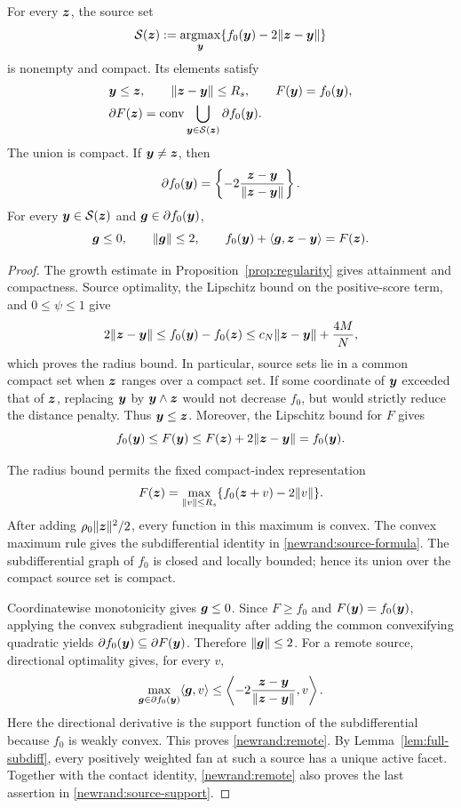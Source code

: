 \begin{lemma}
\label{newrand:sources}
For every $\bm{z}$, the source set
\[
 \mathcal S(\bm{z}):=\operatorname*{argmax}_{\bm{y}}
       \{f_0(\bm{y})-2\|\bm{z}-\bm{y}\|\}
\]
is nonempty and compact. Its elements satisfy
\begin{equation}
 \begin{aligned}
 &\bm{y}\le\bm{z},\qquad \|\bm{z}-\bm{y}\|\le R_s,
       \qquad F(\bm{y})=f_0(\bm{y}),\\
 &\partial F(\bm{z})=\operatorname{conv}
       \bigcup_{\bm{y}\in\mathcal S(\bm{z})}\partial f_0(\bm{y}).
 \end{aligned}
 \label{newrand:source-formula}
\end{equation}
The union is compact. If $\bm{y}\ne\bm{z}$, then
\begin{equation}
 \partial f_0(\bm{y})
 =\left\{-2\frac{\bm{z}-\bm{y}}{\|\bm{z}-\bm{y}\|}\right\}.
 \label{newrand:remote}
\end{equation}
For every $\bm{y}\in\mathcal S(\bm{z})$ and
$\bm{g}\in\partial f_0(\bm{y})$,
\begin{equation}
 \bm{g}\le0,\qquad \|\bm{g}\|\le2,\qquad
 f_0(\bm{y})+\langle\bm{g},\bm{z}-\bm{y}\rangle=F(\bm{z}).
 \label{newrand:source-support}
\end{equation}
\end{lemma}
\begin{proof}
The growth estimate in Proposition~\ref{prop:regularity} gives
attainment and compactness. Source optimality, the Lipschitz
bound on the positive-score term, and $0\le\psi\le1$ give
\[
 2\|\bm{z}-\bm{y}\|\le f_0(\bm{y})-f_0(\bm{z})
 \le c_N\|\bm{z}-\bm{y}\|+\frac{4M}{N},
\]
which proves the radius bound. In particular, source sets lie in
a common compact set when $\bm{z}$ ranges over a compact set.
If some coordinate of $\bm{y}$ exceeded that of $\bm{z}$, replacing
$\bm{y}$ by $\bm{y}\wedge\bm{z}$ would not decrease $f_0$, but would
strictly reduce the distance penalty. Thus $\bm{y}\le\bm{z}$.
Moreover, the Lipschitz bound for $F$ gives
\[
 f_0(\bm{y})\le F(\bm{y})
 \le F(\bm{z})+2\|\bm{z}-\bm{y}\|=f_0(\bm{y}).
\]

The radius bound permits the fixed compact-index representation
\[
 F(\bm{z})=\max_{\|v\|\le R_s}
       \{f_0(\bm{z}+v)-2\|v\|\}.
\]
After adding $\rho_0\|\bm{z}\|^2/2$, every function in this
maximum is convex. The convex maximum rule gives the
subdifferential identity in \eqref{newrand:source-formula}.
The subdifferential graph of $f_0$ is closed and locally bounded;
hence its union over the compact source set is compact.

Coordinatewise monotonicity gives $\bm{g}\le0$.
Since $F\ge f_0$ and $F(\bm{y})=f_0(\bm{y})$, applying the convex
subgradient inequality after adding the common convexifying
quadratic yields
$\partial f_0(\bm{y})\subseteq\partial F(\bm{y})$.
Therefore $\|\bm{g}\|\le2$.
For a remote source, directional optimality gives, for every $v$,
\[
 \max_{\bm{g}\in\partial f_0(\bm{y})}\langle\bm{g},v\rangle
 \le\left\langle-2\frac{\bm{z}-\bm{y}}{\|\bm{z}-\bm{y}\|},v\right\rangle.
\]
Here the directional derivative is the support function of the
subdifferential because $f_0$ is weakly convex.
This proves \eqref{newrand:remote}. By
Lemma~\ref{lem:full-subdiff}, every positively weighted fan at
such a source has a unique active facet.
Together with the contact identity, \eqref{newrand:remote}
also proves the last assertion in \eqref{newrand:source-support}.
\end{proof}


